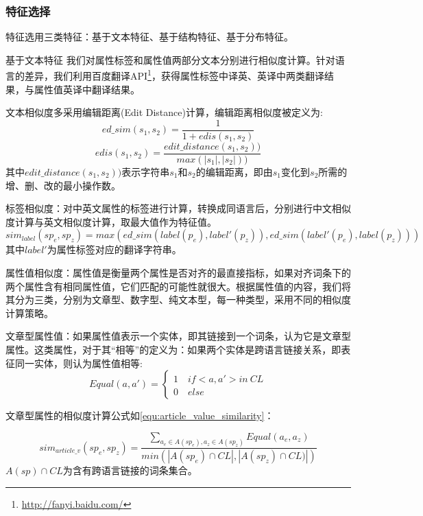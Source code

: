 \subsubsection{特征选择}
特征选用三类特征：基于文本特征、基于结构特征、基于分布特征。

{\heiti 基于文本特征} 我们对属性标签和属性值两部分文本分别进行相似度计算。针对语言的差异，我们利用百度翻译API\footnote{\url{http://fanyi.baidu.com/}}，获得属性标签中译英、英译中两类翻译结果，与属性值英译中翻译结果。

文本相似度多采用编辑距离(Edit Distance)计算，编辑距离相似度被定义为:
\begin{equation}
ed\_sim(s_1, s_2) = \frac{1}{1+edis(s_1,s_2)}
\end{equation}
\begin{equation}
edis(s_1,s_2)=\frac{edit\_distance(s_1, s_2))}{max(\left| s_1 \right |,\left | s_2 \right |))}
\end{equation}
其中$edit\_distance(s_1, s_2))$表示字符串$s_1$和$s_2$的编辑距离，即由$s_1$变化到$s_2$所需的增、删、改的最小操作数。

标签相似度：对中英文属性的标签进行计算，转换成同语言后，分别进行中文相似度计算与英文相似度计算，取最大值作为特征值。
\begin{equation}
\label{}
sim_{label}(sp_e, sp_z) = max(ed\_sim(label(p_e), label'(p_z)), ed\_sim(label'(p_e), label(p_z)))
\end{equation}
其中$label'$为属性标签对应的翻译字符串。

属性值相似度：属性值是衡量两个属性是否对齐的最直接指标，如果对齐词条下的两个属性含有相同属性值，它们匹配的可能性就很大。根据属性值的内容，我们将其分为三类，分别为文章型、数字型、纯文本型，每一种类型，采用不同的相似度计算策略。

文章型属性值：如果属性值表示一个实体，即其链接到一个词条，认为它是文章型属性。这类属性，对于其“相等”的定义为：如果两个实体是跨语言链接关系，即表征同一实体，则认为属性值相等:
\begin{equation}
Equal(a,a')=\left\{\begin{matrix}
1 \quad  if <a,a'> in \ CL\\
0 \quad  else
\end{matrix}\right.
\end{equation}

文章型属性的相似度计算公式如\ref{equ:article_value_similarity}：

\begin{equation}
\label{equ:article_value_similarity}
sim_{article\_v}(sp_e, sp_z) = \frac{\sum_{a_e\in A(sp_e), a_z \in A(sp_z)} Equal(a_e, a_z)}{min(\left| A(sp_e)\cap CL \right|, \left|A(sp_z) \cap CL) \right|)}
\end{equation}
$A(sp)\cap CL$为含有跨语言链接的词条集合。

